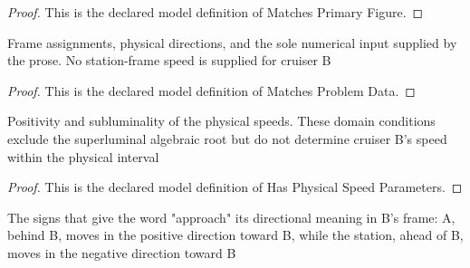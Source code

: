 \begin{proof}
  This is the declared model definition of Matches Primary Figure.
\end{proof}
\begin{definition}
  \label{def:physics:phyx-mini-0589:phyxminiproblems-problemphyxmini0589-matchesproblemdata}
  Frame assignments, physical directions, and the sole numerical input supplied by the prose. No station-frame speed is supplied for cruiser B
\end{definition}
\begin{proof}
  This is the declared model definition of Matches Problem Data.
\end{proof}
\begin{definition}
  \label{def:physics:phyx-mini-0589:phyxminiproblems-problemphyxmini0589-hasphysicalspeedparameters}
  Positivity and subluminality of the physical speeds. These domain conditions exclude the superluminal algebraic root but do not determine cruiser B's speed within the physical interval
\end{definition}
\begin{proof}
  This is the declared model definition of Has Physical Speed Parameters.
\end{proof}
\begin{definition}
  \label{def:physics:phyx-mini-0589:phyxminiproblems-problemphyxmini0589-representsapproachdirections}
  The signs that give the word "approach" its directional meaning in B's frame: A, behind B, moves in the positive direction toward B, while the station, ahead of B, moves in the negative direction toward B
\end{definition}

